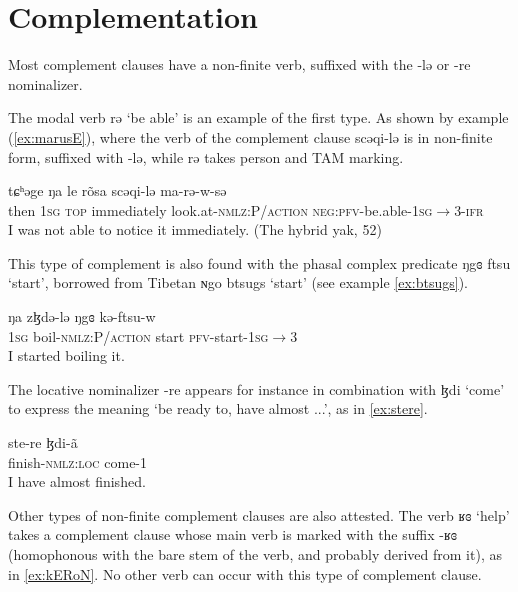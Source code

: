 \documentclass[oneside,a4paper,11pt]{article}
\newcommand{\ipa}[1]{{\phon#1}} %
\begin{document}
 
 

\section{Complementation}  
Most complement clauses have a non-finite verb, suffixed with the \ipa{-lə} or \ipa{-re} nominalizer.

The modal verb \ipa{rə} `be able' is an example of the first type. As shown by example (\ref{ex:marusE}), where the verb of the complement clause \ipa{scəqi-lə}  is in non-finite form, suffixed with \ipa{-lə}, while \ipa{rə} takes person and TAM marking.

\begin{exe}
\ex\label{ex:marusE}
\gll
\ipa{tɕʰəge} 	\ipa{ŋa} 	\ipa{le} 	\ipa{rõsa} 	\ipa{scəqi-lə} 	\ipa{ma-rə-w-sə} \\
then \textsc{1sg} \textsc{top} immediately look.at-\textsc{nmlz:P/action} \textsc{neg:pfv}-be.able-\textsc{1sg}$\rightarrow$3-\textsc{ifr} \\
\glt I was not able to notice it immediately. (The hybrid yak, 52)
\end{exe}

This type of complement is also found with the phasal complex predicate \ipa{ŋgɞ} \ipa{ftsu} `start', borrowed from Tibetan \ipa{ɴgo btsugs} `start' (see example \ref{ex:btsugs}).

\begin{exe}
\ex \label{ex:btsugs}
\gll 
\ipa{ŋa} 	\ipa{zɮdə-lə} 	\ipa{ŋgɞ} 	\ipa{kə-ftsu-w} \\
\textsc{1sg} boil-\textsc{nmlz:P/action} start \textsc{pfv}-start-\textsc{1sg}$\rightarrow$3 \\
\glt I started boiling it.
\end{exe}

The locative nominalizer \ipa{-re} appears for instance in combination with \ipa{ɮdi} `come' to express the meaning `be ready to, have almost ...', as in \ref{ex:stere}.

\begin{exe}
\ex \label{ex:stere}
\gll 
 \ipa{ste-re} 	\ipa{ɮdi-ã} \\
finish-\textsc{nmlz:loc} come-1 \\
\glt I have almost finished.
\end{exe}



Other types of non-finite complement clauses are also attested. The verb \ipa{ʁɞ} `help' takes a complement clause  whose main verb is marked with the suffix \ipa{-ʁɞ} (homophonous with the bare stem of the verb, and probably derived from it), as in \ref{ex:kERoN}. No other verb can occur with this type of complement clause.
\end{document}
